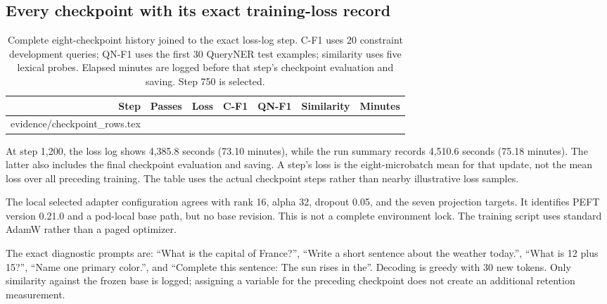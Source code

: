 \subsection{Every checkpoint with its exact training-loss record}
\begin{table}[h]
\centering\small
\caption{Complete eight-checkpoint history joined to the exact loss-log step. C-F1 uses 20 constraint development queries; QN-F1 uses the first 30 QueryNER test examples; similarity uses five lexical probes. Elapsed minutes are logged before that step's checkpoint evaluation and saving. Step 750 is selected.}
\label{tab:checkpoint-log}
\begin{tabular}{rrrrrrr}
\toprule
Step & Passes & Loss & C-F1 & QN-F1 & Similarity & Minutes \\
\midrule
{} evidence/checkpoint_rows.tex
\bottomrule
\end{tabular}
\end{table}

At step 1,200, the loss log shows 4,385.8 seconds (73.10 minutes), while the run summary records 4,510.6 seconds (75.18 minutes). The latter also includes the final checkpoint evaluation and saving. A step's loss is the eight-microbatch mean for that update, not the mean loss over all preceding training. The table uses the actual checkpoint steps rather than nearby illustrative loss samples.

The local selected adapter configuration agrees with rank 16, alpha 32, dropout 0.05, and the seven projection targets. It identifies PEFT version 0.21.0 and a pod-local base path, but no base revision. This is not a complete environment lock. The training script uses standard AdamW rather than a paged optimizer.

The exact diagnostic prompts are: ``What is the capital of France?'', ``Write a short sentence about the weather today.'', ``What is 12 plus 15?'', ``Name one primary color.'', and ``Complete this sentence: The sun rises in the''. Decoding is greedy with 30 new tokens. Only similarity against the frozen base is logged; assigning a variable for the preceding checkpoint does not create an additional retention measurement.

